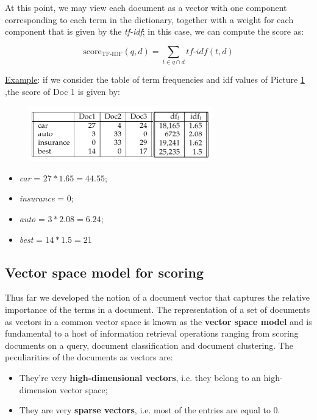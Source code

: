 At this point, we may view each document as a vector with one component corresponding to each term in the dictionary, together with a weight for each component that is given by the \textit{tf-idf}; in this case, we can compute the score as:

$$
\text{score}_{\text{TF-IDF}}(q,d) = \sum_{t \in q \cap d} \textit{tf-idf}(t,d)
$$

\underline{Example}: if we consider the table of term frequencies and idf values of Picture  \ref{ex} ,the score of Doc 1 is given by:

\begin{figure}[h!]
		\centering
		\includegraphics[scale = 2.0]{img/example tf idf.jpg}
		\label{ex}
\end{figure}

\begin{itemize}
    \item \textit{car} = $27 * 1.65 = 44.55$;
    \item \textit{insurance} = $0$;
    \item \textit{auto} = $3* 2.08 = 6.24$;
    \item \textit{best} = $14 * 1.5 = 21$
\end{itemize}

\subsection{Vector space model for scoring}
Thus far we developed the notion of a document vector that captures the relative importance of the terms in a document. The representation of a set of documents as vectors in a common vector space is known as the \textbf{vector space model} and is fundamental to a host of information retrieval operations ranging from scoring documents on a query, document classification and document clustering. The peculiarities of the documents as vectors are:

\begin{itemize}
    \item They're very \textbf{high-dimensional vectors}, i.e. they belong to an high-dimension vector space;
    \item They are very \textbf{sparse vectors}, i.e. most of the entries are equal to 0.
\end{itemize}

